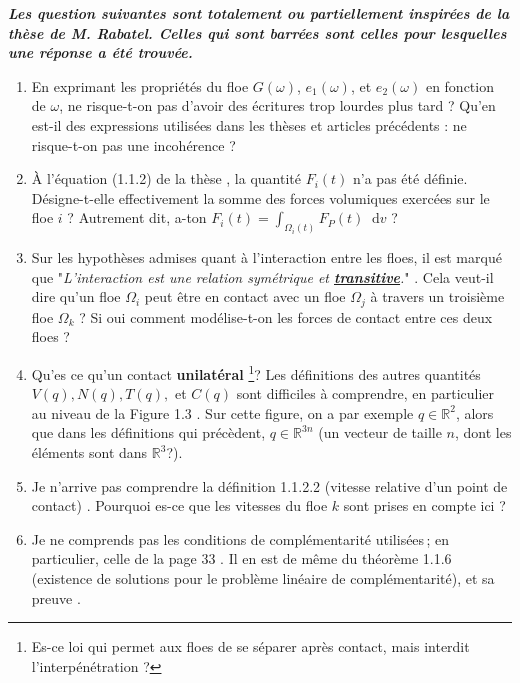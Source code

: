 \documentclass[
  french,
	11pt, %
]{fphw}
\newcommand*\diff{\mathop{}\!\mathrm{d}}
\begin{document}
\textbf{\textit{Les question suivantes sont totalement ou partiellement inspirées de la thèse de M. Rabatel. Celles qui sont barrées sont celles pour lesquelles une réponse a été trouvée.}}

\begin{enumerate}
  \item En exprimant les propriétés du floe $G(\omega)$, $e_1(\omega)$, et $e_2(\omega)$ en fonction de $\omega$, ne risque-t-on pas d'avoir des écritures trop lourdes plus tard ? Qu'en est-il des expressions utilisées dans les thèses et articles précédents : ne risque-t-on pas une incohérence ?

  \item À l'équation (1.1.2) de la thèse \parencite[p.16]{rabatel2015thesis}, la quantité $F_i(t)$ n'a pas été définie. Désigne-t-elle effectivement la somme des forces volumiques exercées sur le floe $i$ ? Autrement dit, a-ton $F_i(t) = \int_{\Omega_i(t)} F_P(t) \diff v$ ?

  \item Sur les hypothèses admises quant à l'interaction entre les floes, il est marqué que "\textit{L’interaction est une relation symétrique et \underline{\textbf{transitive}}.}" \parencite[p.18]{rabatel2015thesis}. Cela veut-il dire qu'un floe $\Omega_i$ peut être en contact avec un floe $\Omega_j$ à travers un troisième floe $\Omega_k$ ? Si oui comment modélise-t-on les forces de contact entre ces deux floes ? 

  \item Qu'es ce qu'un contact \textbf{unilatéral} \parencite[p.20]{rabatel2015thesis} \footnote{Es-ce loi qui permet aux floes de se séparer après contact, mais interdit l’interpénétration \parencite[p.32]{rabatel2015thesis}?}? Les définitions des autres quantités $V(q), N(q), T(q),$ et $C(q)$ sont difficiles à comprendre, en particulier au niveau de la Figure 1.3 \Parencite[P.22]{rabatel2015thesis}. Sur cette figure, on a par exemple $q \in \mathbb{R}^2$, alors que dans les définitions qui précèdent, $q \in \mathbb{R}^{3n}$ (un vecteur de taille $n$, dont les éléments sont dans $\mathbb{R}^3$?).

  \item Je n'arrive pas comprendre la définition 1.1.2.2 (vitesse relative d’un point de contact) \parencite[p.26]{rabatel2015thesis}. Pourquoi es-ce que les vitesses du floe $k$ sont prises en compte ici ?

  \item Je ne comprends pas les conditions de complémentarité utilisées ; en particulier, celle de la page 33 \parencite[p.33]{rabatel2015thesis}. Il en est de même du théorème 1.1.6 (existence de solutions pour le problème linéaire de complémentarité), et sa preuve \parencite[p.36]{rabatel2015thesis}.


\end{enumerate}
\end{document}
